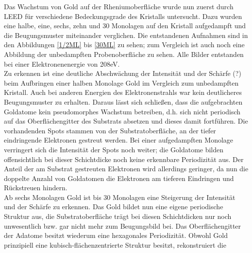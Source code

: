 Das Wachstum von Gold auf der Rheniumoberfläche wurde nun zuerst durch LEED für
verschiedene Bedeckungsgrade des Kristalls untersucht. Dazu wurden eine halbe, eine, sechs, zehn und
30 Monolagen auf den Kristall aufgedampft und die Beugungsmuster miteinander verglichen. Die
entstandenen Aufnahmen sind in den Abbildungen \ref{1/2ML} bis \ref{30ML} zu sehen; zum Vergleich
ist auch noch eine Abbildung der unbedampften Probenoberfläche zu sehen. Alle Bilder entstanden
bei einer Elektronenenergie von 208eV.\\
Zu erkennen ist eine deutliche Abschwächung der Intensität und der Schärfe (?) beim Aufbringen einer
halben Monolage Gold im Vergleich zum unbedampften Kristall. Auch bei anderen Energien des
Elektronenstrahls war kein deutlicheres Beugungsmuster zu erhalten. Daraus lässt sich schließen,
dass die aufgebrachten Goldatome kein pseudomorphes Wachstum betreiben, d.h. sich nicht periodisch
auf das Oberflächengitter des Substrats absetzen und dieses damit fortführen. Die vorhandenden Spots
stammen von der Substratoberfläche, an der tiefer eindringende Elektronen gestreut werden. Bei einer
aufgedampften Monolage verringert sich die Intensität der Spots noch weiter; die Goldatome bilden
offensichtlich bei dieser Schichtdicke noch keine erkennbare Periodizität aus. Der Anteil der am
Substrat gestreuten Elektronen wird allerdings geringer, da nun die doppelte Anzahl von Goldatomen
die Elektronen am tieferen Eindringen und Rückstreuen hindern.\\
Ab sechs Monolagen Gold ist bis 30 Monolagen eine Steigerung der Intensität und der Schärfe zu
erkennen. Das Gold bildet nun eine eigene periodische Struktur aus, die Substratoberfläche trägt
bei diesen Schichtdicken nur noch unwesentlich bzw. gar nicht mehr zum Beugungsbild bei. Das
Oberflächengitter der Adatome besitzt wiederum eine hexagonales Periodizität. Obwohl Gold
prinzipiell eine kubisch-flächenzentrierte Struktur besitzt, rekonstruiert die 

